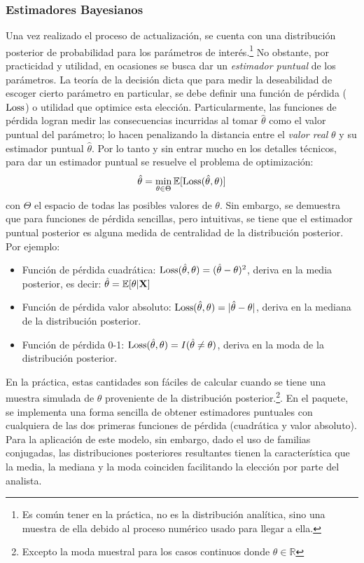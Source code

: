 \documentclass[../Main/Main.tex]{subfiles}
\begin{document}
\subsubsection{Estimadores Bayesianos}
Una vez realizado el proceso de actualización, se cuenta con una distribución posterior de probabilidad para los parámetros de interés.\footnote{Es común tener en la práctica, no es la distribución analítica, sino una muestra de ella debido al proceso numérico usado para llegar a ella.} No obstante, por practicidad y utilidad, en ocasiones se busca dar un \textit{estimador puntual} de los parámetros. La teoría de la decisión dicta que para medir la deseabilidad de escoger cierto parámetro en particular, se debe definir una función de pérdida ($\text{Loss}$) o utilidad que optimice esta elección. Particularmente, las funciones de pérdida logran medir las consecuencias incurridas al tomar $\hat{\theta}$ como el valor puntual del parámetro; lo hacen penalizando la distancia entre el \emph{valor real} $\theta$ y su estimador puntual $\hat{\theta}$. Por lo tanto y sin entrar mucho en los detalles técnicos, para dar un estimador puntual se resuelve el problema de optimización: 
\begin{align}
\hat{\theta} = \min_{\theta \in{\Theta}}\mathbb{E}[\text{Loss}(\hat{\theta},\theta)]
\end{align}
con $\Theta$ el espacio de todas las posibles valores de $\theta$. Sin embargo, se demuestra que para funciones de pérdida sencillas, pero intuitivas, se tiene que el estimador puntual posterior es alguna medida de centralidad de la distribución posterior. Por ejemplo:
\begin{itemize}[label={}]
	\item Función de pérdida cuadrática: $\text{Loss}(\hat{\theta},\theta) = (\hat{\theta}-\theta)^2$, deriva en la media posterior, es decir: $\hat{\theta} = \mathbb{E}[\theta|\mathbf{X}]$ 
	\item Función de pérdida valor absoluto: $\text{Loss}(\hat{\theta},\theta) = |\hat{\theta}-\theta|$, deriva en la mediana de la distribución posterior.
	\item Función de pérdida 0-1:  $\text{Loss}(\hat{\theta},\theta) = I(\hat{\theta} \neq \theta)$, deriva en la moda de la distribución posterior. 
\end{itemize}
En la práctica, estas cantidades son fáciles de calcular cuando se tiene una muestra simulada de $\theta$ proveniente de la distribución posterior.\footnote{Excepto la moda muestral para los casos continuos donde $\theta\in\mathbb{R}$}. En el paquete, se implementa una forma sencilla de obtener estimadores puntuales con cualquiera de las dos primeras funciones de pérdida (cuadrática y valor absoluto). Para la aplicación de este modelo, sin embargo, dado el uso de familias conjugadas, las distribuciones posteriores resultantes tienen la característica que la media, la mediana y la moda coinciden facilitando la elección por parte del analista.
\end{document}
